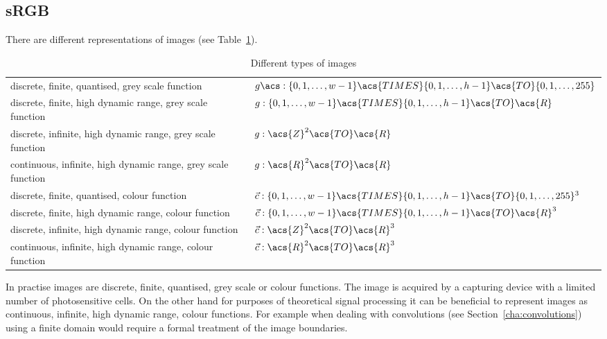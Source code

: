 \documentclass[12pt,a4paper,oneside,openright]{book}
\newcommand{\Eg}{For example }
\newcommand{\sct}[1]{Section~\ref{cha:#1}}
\newcommand{\tbl}[1]{Table~\ref{tbl:#1}}
\begin{document}
\begin{CJK}{UTF8}{}
\subsection{\acs{sRGB}}\label{cha:rgb}
There are different representations of images (see \tbl{image}).
\begin{table}[htbp]
  \begin{center}
    \caption{Different types of images\label{tbl:image}}\vspace{1em}
    \begin{small}
      \begin{tabular}{ll}\toprule
        \parbox[t]{.37\textwidth}{discrete, finite, quantised, grey scale function} &
        \parbox[t]{.55\textwidth}{$g\acs:\{0,1,\ldots,w-1\}\acs{TIMES}\{0,1,\ldots,h-1\}\acs{TO}\{0,1,\ldots,255\}$}\smallskip\\
        \parbox[t]{.37\textwidth}{discrete, finite, high dynamic range, grey scale function} &
        \parbox[t]{.55\textwidth}{$g:\{0,1,\ldots,w-1\}\acs{TIMES}\{0,1,\ldots,h-1\}\acs{TO}\acs{R}$}\smallskip\\
        \parbox[t]{.37\textwidth}{discrete, infinite, high dynamic range, grey scale function} &
        \parbox[t]{.55\textwidth}{$g:\acs{Z}^2\acs{TO}\acs{R}$}\smallskip\\
        \parbox[t]{.37\textwidth}{continuous, infinite, high dynamic range, grey scale function} &
        \parbox[t]{.55\textwidth}{$g:\acs{R}^2\acs{TO}\acs{R}$}\\\midrule
        \parbox[t]{.37\textwidth}{discrete, finite, quantised, colour function} &
        \parbox[t]{.55\textwidth}{$\vec{c}:\{0,1,\ldots,w-1\}\acs{TIMES}\{0,1,\ldots,h-1\}\acs{TO}\{0,1,\ldots,255\}^3$}\smallskip\\
        \parbox[t]{.37\textwidth}{discrete, finite, high dynamic range, colour function} &
        \parbox[t]{.55\textwidth}{$\vec{c}:\{0,1,\ldots,w-1\}\acs{TIMES}\{0,1,\ldots,h-1\}\acs{TO}\acs{R}^3$}\smallskip\\
        \parbox[t]{.37\textwidth}{discrete, infinite, high dynamic range, colour function} &
        \parbox[t]{.55\textwidth}{$\vec{c}:\acs{Z}^2\acs{TO}\acs{R}^3$}\smallskip\\
        \parbox[t]{.37\textwidth}{continuous, infinite, high dynamic range, colour function} &
        \parbox[t]{.55\textwidth}{$\vec{c}:\acs{R}^2\acs{TO}\acs{R}^3$}\\\bottomrule
      \end{tabular}
    \end{small}
  \end{center}
\end{table}
In practise images are discrete, finite, quantised, grey scale or colour functions. The image is acquired by a capturing device with a limited number of photosensitive cells. On the other hand for purposes of theoretical signal processing it can be beneficial to represent images as continuous, infinite, high dynamic range, colour functions. \Eg when dealing with convolutions (see \sct{convolutions}) using a finite domain would require a formal treatment of the image boundaries.


\end{CJK}
\end{document}

